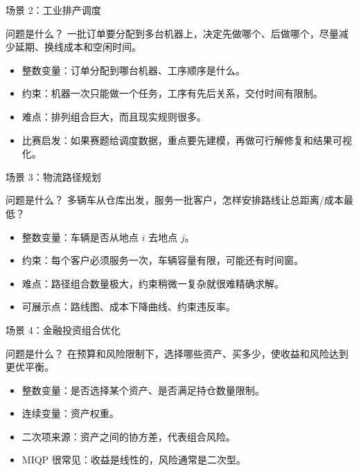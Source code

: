 \documentclass[aspectratio=169]{beamer}
\begin{document}
\begin{frame}{场景 2：工业排产调度}
\small
\begin{block}{问题是什么？}
  一批订单要分配到多台机器上，决定先做哪个、后做哪个，尽量减少延期、换线成本和空闲时间。
\end{block}

\begin{itemize}
  \item 整数变量：订单分配到哪台机器、工序顺序是什么。
  \item 约束：机器一次只能做一个任务，工序有先后关系，交付时间有限制。
  \item 难点：排列组合巨大，而且现实规则很多。
  \item 比赛启发：如果赛题给调度数据，重点要先建模，再做可行解修复和结果可视化。
\end{itemize}
\end{frame}

\begin{frame}{场景 3：物流路径规划}
\small
\begin{block}{问题是什么？}
  多辆车从仓库出发，服务一批客户，怎样安排路线让总距离/成本最低？
\end{block}

\begin{itemize}
  \item 整数变量：车辆是否从地点 $i$ 去地点 $j$。
  \item 约束：每个客户必须服务一次，车辆容量有限，可能还有时间窗。
  \item 难点：路径组合数量极大，约束稍微一复杂就很难精确求解。
  \item 可展示点：路线图、成本下降曲线、约束违反率。
\end{itemize}
\end{frame}

\begin{frame}{场景 4：金融投资组合优化}
\small
\begin{block}{问题是什么？}
  在预算和风险限制下，选择哪些资产、买多少，使收益和风险达到更优平衡。
\end{block}

\begin{itemize}
  \item 整数变量：是否选择某个资产、是否满足持仓数量限制。
  \item 连续变量：资产权重。
  \item 二次项来源：资产之间的协方差，代表组合风险。
  \item MIQP 很常见：收益是线性的，风险通常是二次型。
\end{itemize}
\end{frame}
\end{document}
